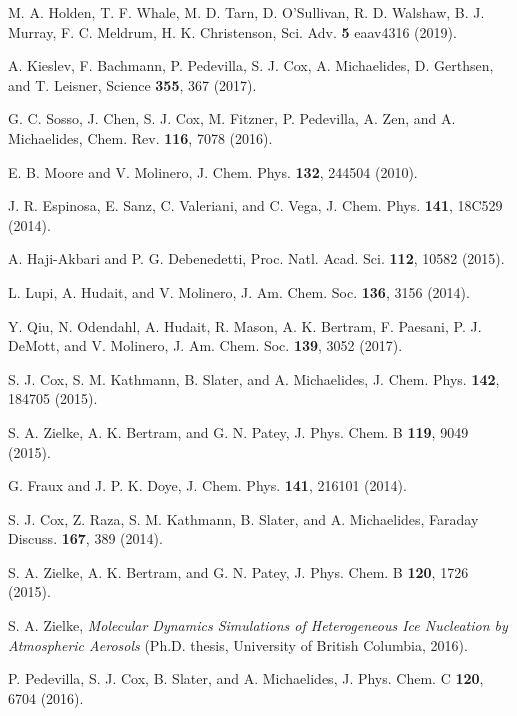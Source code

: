 \documentclass[preprint,aps,prb,floatfix]{revtex4-1}
\begin{document}
\begin{thebibliography}{10}
 M. A. Holden, T. F. Whale, M. D. Tarn, D. O'Sullivan, R. D. Walshaw, B. J. Murray, F. C. Meldrum, H. K. Christenson, Sci. Adv. {\bf 5} eaav4316 (2019). 

 A. Kieslev, F. Bachmann, P. Pedevilla, S. J. Cox, A. Michaelides, D. Gerthsen, and T. Leisner, 
Science {\bf 355}, 367 (2017). 

 G. C. Sosso, J. Chen, S. J. Cox, M. Fitzner, P. Pedevilla, A. Zen, and A. Michaelides, 
Chem. Rev. {\bf 116}, 7078 (2016). 

 E. B. Moore and V. Molinero, J. Chem. Phys. {\bf 132}, 244504 (2010). 

 J. R. Espinosa, E. Sanz, C. Valeriani, and C. Vega, J. Chem. Phys. {\bf 141}, 18C529 (2014).

 A. Haji-Akbari and P. G. Debenedetti, Proc. Natl. Acad. Sci. {\bf 112}, 10582 (2015). 


 L. Lupi, A. Hudait, and V. Molinero, J. Am. Chem. Soc. {\bf 136}, 3156 (2014). 

 Y. Qiu, N. Odendahl, A. Hudait, R. Mason, A. K. Bertram, F. Paesani, P. J. DeMott, and V. Molinero, J. Am. Chem. Soc. {\bf 139}, 3052 (2017). 

 S. J. Cox, S. M. Kathmann, B. Slater, and A. Michaelides, J. Chem. Phys. {\bf 142}, 184705 (2015). 

 S. A. Zielke, A. K. Bertram, and G. N. Patey, J. Phys. Chem. B {\bf 119}, 9049 (2015).

 G. Fraux and J. P. K. Doye, J. Chem. Phys. {\bf 141}, 216101 (2014). 


 S. J. Cox, Z. Raza, S. M. Kathmann, B. Slater, and A. Michaelides, Faraday Discuss. {\bf 167}, 389 (2014).

 S. A. Zielke, A. K. Bertram, and G. N. Patey, J. Phys. Chem. B {\bf 120}, 1726 (2015).

 S. A. Zielke, {\it Molecular Dynamics Simulations of Heterogeneous Ice Nucleation by Atmospheric Aerosols} (Ph.D. thesis, University of British Columbia, 2016). 

 P. Pedevilla, S. J. Cox, B. Slater, and A. Michaelides, J. Phys. Chem. C {\bf 120}, 6704 (2016). 


\end{thebibliography}
\end{document}
